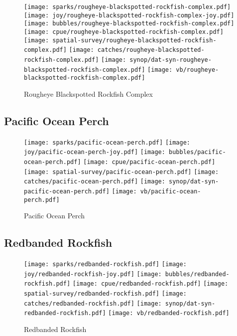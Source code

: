 \begin{figure}[htbp]
\centering
\texttt{[image: sparks/rougheye-blackspotted-rockfish-complex.pdf]}
\texttt{[image: joy/rougheye-blackspotted-rockfish-complex-joy.pdf]}
\texttt{[image: bubbles/rougheye-blackspotted-rockfish-complex.pdf]}
\texttt{[image: cpue/rougheye-blackspotted-rockfish-complex.pdf]}
\texttt{[image: spatial-survey/rougheye-blackspotted-rockfish-complex.pdf]}
\texttt{[image: catches/rougheye-blackspotted-rockfish-complex.pdf]}
\texttt{[image: synop/dat-syn-rougheye-blackspotted-rockfish-complex.pdf]}
\texttt{[image: vb/rougheye-blackspotted-rockfish-complex.pdf]}
\caption{Rougheye Blackspotted Rockfish Complex}
\end{figure}
\clearpage
\subsection*{Pacific Ocean Perch}

\begin{figure}[htbp]
\centering
\texttt{[image: sparks/pacific-ocean-perch.pdf]}
\texttt{[image: joy/pacific-ocean-perch-joy.pdf]}
\texttt{[image: bubbles/pacific-ocean-perch.pdf]}
\texttt{[image: cpue/pacific-ocean-perch.pdf]}
\texttt{[image: spatial-survey/pacific-ocean-perch.pdf]}
\texttt{[image: catches/pacific-ocean-perch.pdf]}
\texttt{[image: synop/dat-syn-pacific-ocean-perch.pdf]}
\texttt{[image: vb/pacific-ocean-perch.pdf]}
\caption{Pacific Ocean Perch}
\end{figure}
\clearpage
\subsection*{Redbanded Rockfish}

\begin{figure}[htbp]
\centering
\texttt{[image: sparks/redbanded-rockfish.pdf]}
\texttt{[image: joy/redbanded-rockfish-joy.pdf]}
\texttt{[image: bubbles/redbanded-rockfish.pdf]}
\texttt{[image: cpue/redbanded-rockfish.pdf]}
\texttt{[image: spatial-survey/redbanded-rockfish.pdf]}
\texttt{[image: catches/redbanded-rockfish.pdf]}
\texttt{[image: synop/dat-syn-redbanded-rockfish.pdf]}
\texttt{[image: vb/redbanded-rockfish.pdf]}
\caption{Redbanded Rockfish}
\end{figure}
\clearpage
